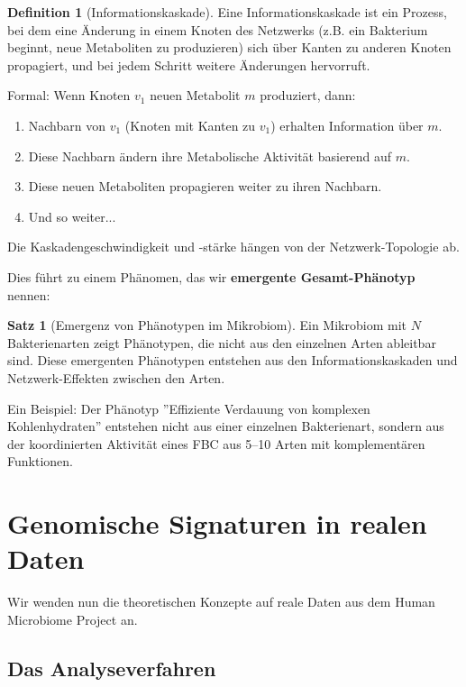 \documentclass[a4paper,12pt]{article}
\theoremstyle{definition}
\newtheorem{definition}{Definition}
\newtheorem{satz}{Satz}
\begin{document}
\begin{definition}[Informationskaskade]
Eine Informationskaskade ist ein Prozess, bei dem eine Änderung in einem Knoten des Netzwerks (z.B. ein Bakterium beginnt, neue Metaboliten zu produzieren) sich über Kanten zu anderen Knoten propagiert, und bei jedem Schritt weitere Änderungen hervorruft.

Formal: Wenn Knoten $v_1$ neuen Metabolit $m$ produziert, dann:
\begin{enumerate}
    \item Nachbarn von $v_1$ (Knoten mit Kanten zu $v_1$) erhalten Information über $m$.
    \item Diese Nachbarn ändern ihre Metabolische Aktivität basierend auf $m$.
    \item Diese neuen Metaboliten propagieren weiter zu ihren Nachbarn.
    \item Und so weiter...
\end{enumerate}

Die Kaskadengeschwindigkeit und -stärke hängen von der Netzwerk-Topologie ab.
\end{definition}

Dies führt zu einem Phänomen, das wir \textbf{emergente Gesamt-Phänotyp} nennen:

\begin{satz}[Emergenz von Phänotypen im Mikrobiom]
Ein Mikrobiom mit $N$ Bakterienarten zeigt Phänotypen, die nicht aus den einzelnen Arten ableitbar sind. Diese emergenten Phänotypen entstehen aus den Informationskaskaden und Netzwerk-Effekten zwischen den Arten.

Ein Beispiel: Der Phänotyp ''Effiziente Verdauung von komplexen Kohlenhydraten'' entstehen nicht aus einer einzelnen Bakterienart, sondern aus der koordinierten Aktivität eines FBC aus 5--10 Arten mit komplementären Funktionen.
\end{satz}

\section{Genomische Signaturen in realen Daten}


Wir wenden nun die theoretischen Konzepte auf reale Daten aus dem Human Microbiome Project an.

\subsection{Das Analyseverfahren}
\end{document}
